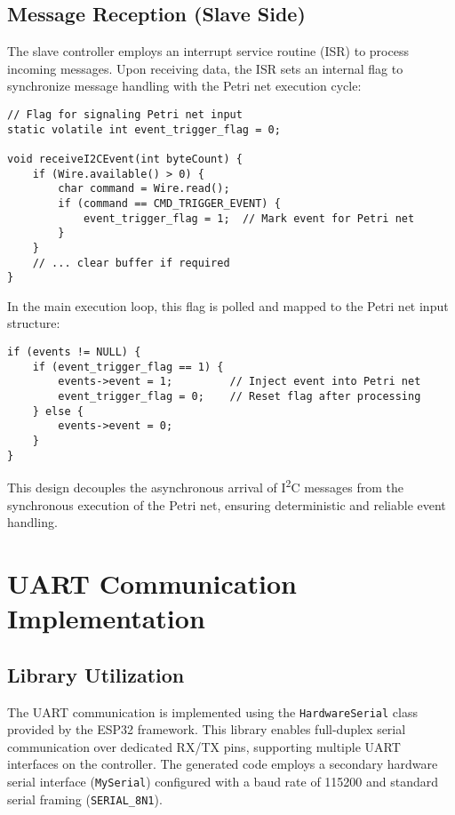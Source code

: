 \subsection{Message Reception (Slave Side)}
The slave controller employs an interrupt service routine (ISR) to process incoming messages. Upon receiving data, the ISR sets an internal flag to synchronize message handling with the Petri net execution cycle:
\begin{verbatim}
// Flag for signaling Petri net input
static volatile int event_trigger_flag = 0;

void receiveI2CEvent(int byteCount) {
    if (Wire.available() > 0) {
        char command = Wire.read();
        if (command == CMD_TRIGGER_EVENT) {
            event_trigger_flag = 1;  // Mark event for Petri net
        }
    }
    // ... clear buffer if required
}
\end{verbatim}
In the main execution loop, this flag is polled and mapped to the Petri net input structure:
\begin{verbatim}
if (events != NULL) {
    if (event_trigger_flag == 1) {
        events->event = 1;         // Inject event into Petri net
        event_trigger_flag = 0;    // Reset flag after processing
    } else {
        events->event = 0;
    }
}
\end{verbatim}
This design decouples the asynchronous arrival of I\textsuperscript{2}C messages from the synchronous execution of the Petri net, ensuring deterministic and reliable event handling.



\section{UART Communication Implementation}
\label{sec:uart_implementation}

\subsection{Library Utilization}
The UART communication is implemented using the \texttt{HardwareSerial} class provided by the ESP32 framework. This library enables full-duplex serial communication over dedicated RX/TX pins, supporting multiple UART interfaces on the controller. The generated code employs a secondary hardware serial interface (\texttt{MySerial}) configured with a baud rate of 115200 and standard serial framing (\texttt{SERIAL\_8N1}).

